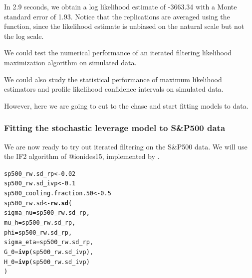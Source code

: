 \documentclass{beamer}\usepackage[]{graphicx}\usepackage[]{color}
\makeatletter
\newcommand{\hlnum}[1]{\textcolor[rgb]{0.686,0.059,0.569}{#1}}%
\newcommand{\hlstd}[1]{\textcolor[rgb]{0.345,0.345,0.345}{#1}}%
\newcommand{\hlkwb}[1]{\textcolor[rgb]{0.69,0.353,0.396}{#1}}%
\newcommand{\hlkwc}[1]{\textcolor[rgb]{0.333,0.667,0.333}{#1}}%
\newcommand{\hlkwd}[1]{\textcolor[rgb]{0.737,0.353,0.396}{\textbf{#1}}}%
\newenvironment{kframe}{%
 \def\at@end@of@kframe{}%
 \ifinner\ifhmode%
  \def\at@end@of@kframe{\end{minipage}}%
  \begin{minipage}{\columnwidth}%
 \fi\fi%
 \def\FrameCommand##1{\hskip\@totalleftmargin \hskip-\fboxsep
 \colorbox{shadecolor}{##1}\hskip-\fboxsep
     \hskip-\linewidth \hskip-\@totalleftmargin \hskip\columnwidth}%
 \MakeFramed {\advance\hsize-\width
   \@totalleftmargin\z@ \linewidth\hsize
   \@setminipage}}%
 {\par\unskip\endMakeFramed%
 \at@end@of@kframe}
\newenvironment{knitrout}{}{} %
\makeatother
\begin{document}
\begin{frame}[fragile]

\bi

\item In  2.9 seconds, we obtain a log likelihood estimate of -3663.34 with a Monte standard error of 1.93. Notice that the replications are averaged using the  function, since the likelihood estimate is unbiased on the natural scale but not the log scale.

\item We could test the numerical performance of an iterated filtering likelihood maximization algorithm on simulated data. 

\item We could also study the statistical performance of maximum likelihood estimators and profile likelihood confidence intervals on simulated data. 

\item However, here we are going to cut to the chase and start fitting models to data. 

\ei

\end{frame}

\begin{frame}[fragile]

\frametitle{Fitting the stochastic leverage model to S\&P500 data}

\bi

\item We are now ready to try out iterated filtering on the S\&P500 data. We will use the IF2 algorithm of @ionides15, implemented by .

\ei

\begin{knitrout}\small
{}\color{fgcolor}\begin{kframe}
\begin{alltt}
\hlstd{sp500_rw.sd_rp} \hlkwb{<-} \hlnum{0.02}
\hlstd{sp500_rw.sd_ivp} \hlkwb{<-} \hlnum{0.1}
\hlstd{sp500_cooling.fraction.50} \hlkwb{<-} \hlnum{0.5}
\hlstd{sp500_rw.sd} \hlkwb{<-} \hlkwd{rw.sd}\hlstd{(}
  \hlkwc{sigma_nu}  \hlstd{= sp500_rw.sd_rp,}
  \hlkwc{mu_h}      \hlstd{= sp500_rw.sd_rp,}
  \hlkwc{phi}       \hlstd{= sp500_rw.sd_rp,}
  \hlkwc{sigma_eta} \hlstd{= sp500_rw.sd_rp,}
  \hlkwc{G_0}       \hlstd{=} \hlkwd{ivp}\hlstd{(sp500_rw.sd_ivp),}
  \hlkwc{H_0}       \hlstd{=} \hlkwd{ivp}\hlstd{(sp500_rw.sd_ivp)}
\hlstd{)}
\end{alltt}
\end{kframe}
\end{knitrout}

\end{frame}
\end{document}
